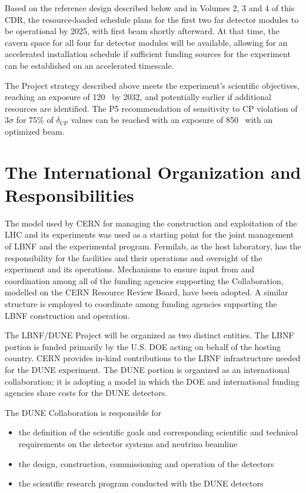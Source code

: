 Based on the reference design described below and in Volumes 2, 3 and 4 of this 
CDR, the resource-loaded schedule plans for the first two  far detector modules to be
operational by 2025, with first beam shortly afterward. At that time, the cavern 
space for all four  far detector modules will be available, allowing for 
an accelerated installation schedule if sufficient funding sources for
the experiment can be established on an accelerated timescale.  

\vspace{6pt}
The Project strategy described above meets the experiment's scientific objectives,
 reaching an exposure of 
\num{120}~\ktMWyr{} by 2032, and potentially earlier if additional resources are identified. 
The P5 recommendation of sensitivity to CP violation of 3$\sigma$ for 75\% of $\delta_\text{CP}$
values can be reached with an exposure of \num{850}~\ktMWyr{} with an optimized beam.

\section{The International Organization and Responsibilities}

The 
model used by CERN for managing the construction and exploitation of the LHC and its experiments was used as a starting point for the joint management of LBNF and the experimental program.  Fermilab, as the host laboratory, has the responsibility for the facilities and their operations 
and oversight of the experiment and its operations.  Mechanisms to ensure input from and coordination among all of the funding agencies supporting the Collaboration, modelled on the CERN Resource Review Board, have been adopted. 
A similar structure is employed to coordinate among funding agencies supporting the LBNF construction and operation.  

The LBNF/DUNE Project will be organized as two distinct entities. The LBNF portion is funded primarily
by the U.S. DOE acting on behalf of the hosting country.  CERN provides in-kind contributions to the LBNF infrastructure needed for the DUNE experiment. The DUNE portion is organized
as an international collaboration; it is adopting a model in which the DOE and international funding agencies share costs  
for the DUNE detectors.

The DUNE Collaboration is responsible for
\begin{itemize}
\item the definition of the scientific goals and corresponding scientific and technical requirements on the detector systems and neutrino beamline
\item the design, construction, commissioning and operation of the detectors
\item the scientific research program conducted with the DUNE detectors 

\end{itemize}

